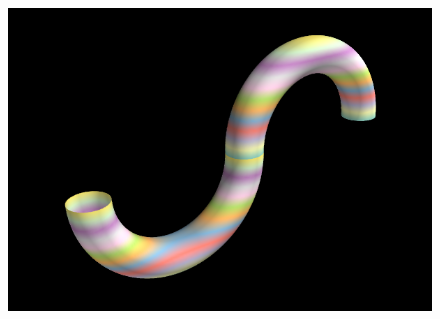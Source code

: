 \documentclass[a4paper,12pt]{article}
\theoremstyle{zad}
\begin{document}
\begin{figure}[!h]
\centering
\includegraphics[scale=0.25]{slika2.png}
\vspace*{-10pt}
\caption{}
\label{slika2}
\end{figure}\vspace*{5pt}
\end{document}
